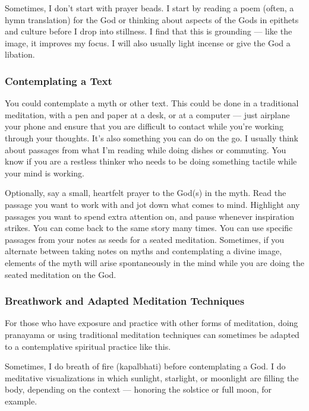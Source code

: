\documentclass[
]{book}
\begin{document}
Sometimes, I don't start with prayer beads. I start by reading a poem (often, a hymn translation) for the God or thinking about aspects of the Gods in epithets and culture before I drop into stillness. I find that this is grounding --- like the image, it improves my focus. I will also usually light incense or give the God a libation.

\hypertarget{contemplating-a-text}{%
\subsubsection{Contemplating a Text}\label{contemplating-a-text}}

You could contemplate a myth or other text. This could be done in a traditional meditation, with a pen and paper at a desk, or at a computer --- just airplane your phone and ensure that you are difficult to contact while you're working through your thoughts. It's also something you can do on the go. I usually think about passages from what I'm reading while doing dishes or commuting. You know if you are a restless thinker who needs to be doing something tactile while your mind is working.

Optionally, say a small, heartfelt prayer to the God(s) in the myth. Read the passage you want to work with and jot down what comes to mind. Highlight any passages you want to spend extra attention on, and pause whenever inspiration strikes. You can come back to the same story many times. You can use specific passages from your notes as seeds for a seated meditation. Sometimes, if you alternate between taking notes on myths and contemplating a divine image, elements of the myth will arise spontaneously in the mind while you are doing the seated meditation on the God.

\hypertarget{breathwork-and-adapted-meditation-techniques}{%
\subsubsection{Breathwork and Adapted Meditation Techniques}\label{breathwork-and-adapted-meditation-techniques}}

For those who have exposure and practice with other forms of meditation, doing pranayama or using traditional meditation techniques can sometimes be adapted to a contemplative spiritual practice like this.

Sometimes, I do breath of fire (kapalbhati) before contemplating a God. I do meditative visualizations in which sunlight, starlight, or moonlight are filling the body, depending on the context --- honoring the solstice or full moon, for example.
\end{document}
